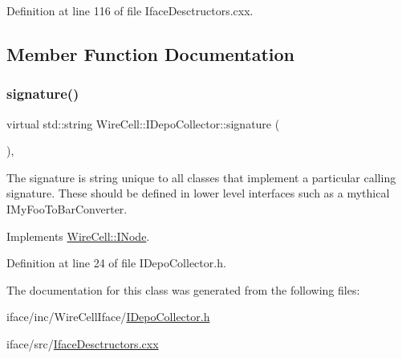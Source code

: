 Definition at line 116 of file Iface\+Desctructors.\+cxx.



\subsection{Member Function Documentation}
\mbox{\label{class_wire_cell_1_1_i_depo_collector_a0ea88b8d3e723800a2bbe3e4bd0c9793}} 
\subsubsection{\texorpdfstring{signature()}{signature()}}
{\footnotesize\ttfamily virtual std\+::string Wire\+Cell\+::\+I\+Depo\+Collector\+::signature (\begin{DoxyParamCaption}{ }\end{DoxyParamCaption})\hspace{0.3cm}{\ttfamily [inline]}, {\ttfamily [virtual]}}

The signature is string unique to all classes that implement a particular calling signature. These should be defined in lower level interfaces such as a mythical I\+My\+Foo\+To\+Bar\+Converter. 

Implements \hyperlink{class_wire_cell_1_1_i_node_a0b0763465adf5ba7febe8e378162b584}{Wire\+Cell\+::\+I\+Node}.



Definition at line 24 of file I\+Depo\+Collector.\+h.



The documentation for this class was generated from the following files\+:\begin{DoxyCompactItemize}
\item 
iface/inc/\+Wire\+Cell\+Iface/\hyperlink{_i_depo_collector_8h}{I\+Depo\+Collector.\+h}\item 
iface/src/\hyperlink{_iface_desctructors_8cxx}{Iface\+Desctructors.\+cxx}\end{DoxyCompactItemize}
